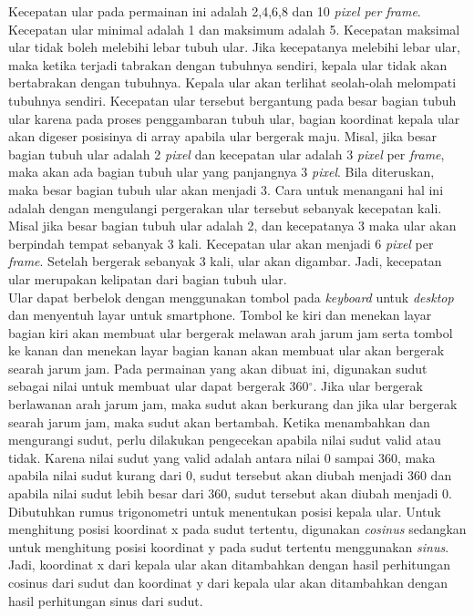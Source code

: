 Kecepatan ular pada permainan ini adalah 2,4,6,8 dan 10 \textit{pixel per frame}. Kecepatan ular minimal adalah 1 dan maksimum adalah 5. Kecepatan maksimal ular tidak boleh melebihi lebar tubuh ular. Jika kecepatanya melebihi lebar ular, maka ketika terjadi tabrakan dengan tubuhnya sendiri, kepala ular tidak akan bertabrakan dengan tubuhnya. Kepala ular akan terlihat seolah-olah melompati tubuhnya sendiri. Kecepatan ular tersebut bergantung pada besar bagian tubuh ular karena pada proses penggambaran tubuh ular, bagian koordinat kepala ular akan digeser posisinya di array apabila ular bergerak maju. Misal, jika besar bagian tubuh ular adalah 2 \textit{pixel} dan kecepatan ular adalah 3 \textit{pixel} per \textit{frame}, maka akan ada bagian tubuh ular yang panjangnya 3 \textit{pixel}. Bila diteruskan, maka besar bagian tubuh ular akan menjadi 3. Cara untuk menangani hal ini adalah dengan mengulangi pergerakan ular tersebut sebanyak kecepatan kali. Misal jika besar bagian tubuh ular adalah 2, dan kecepatanya 3 maka ular akan berpindah tempat sebanyak 3 kali. Kecepatan ular akan menjadi 6 \textit{pixel} per \textit{frame}. Setelah bergerak sebanyak 3 kali, ular akan digambar. Jadi, kecepatan ular merupakan kelipatan dari bagian tubuh ular. \\

Ular dapat berbelok dengan menggunakan tombol pada \textit{keyboard} untuk \textit{desktop} dan menyentuh layar untuk smartphone. Tombol ke kiri dan menekan layar bagian kiri akan membuat ular bergerak melawan arah jarum jam serta tombol ke kanan dan menekan layar bagian kanan akan membuat ular akan bergerak searah jarum jam. Pada permainan yang akan dibuat ini, digunakan sudut sebagai nilai untuk membuat ular dapat bergerak 360$^\circ$. Jika ular bergerak berlawanan arah jarum jam, maka sudut akan berkurang dan jika ular bergerak searah jarum jam, maka sudut akan bertambah. Ketika menambahkan dan mengurangi sudut, perlu dilakukan pengecekan apabila nilai sudut valid atau tidak. Karena nilai sudut yang valid adalah antara nilai 0 sampai 360, maka apabila nilai sudut kurang dari 0, sudut tersebut akan diubah menjadi 360 dan apabila nilai sudut lebih besar dari 360, sudut tersebut akan diubah menjadi 0. Dibutuhkan rumus trigonometri untuk menentukan posisi kepala ular. Untuk menghitung posisi koordinat x pada sudut tertentu, digunakan \textit{cosinus} sedangkan untuk menghitung posisi koordinat y pada sudut tertentu menggunakan \textit{sinus}. Jadi, koordinat x dari kepala ular akan ditambahkan dengan hasil perhitungan cosinus dari sudut dan koordinat y dari kepala ular akan ditambahkan dengan hasil perhitungan sinus dari sudut.

